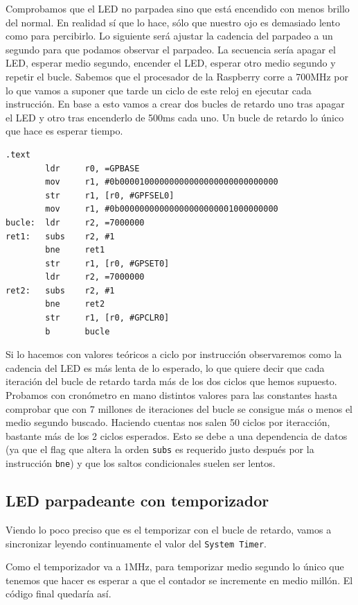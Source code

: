 Comprobamos que el LED no parpadea sino que está encendido con menos brillo del normal.
En realidad sí que lo hace, sólo que nuestro ojo es demasiado lento como para percibirlo.
Lo siguiente será ajustar la cadencia del parpadeo a un segundo para que podamos observar
el parpadeo. La secuencia sería apagar el LED, esperar medio segundo, encender el LED,
esperar otro medio segundo y repetir el bucle. Sabemos que el procesador de la Raspberry
corre a 700MHz por lo que vamos a suponer que tarde un ciclo de este reloj en ejecutar
cada instrucción. En base a esto vamos a crear dos bucles de retardo uno tras apagar el LED
y otro tras encenderlo de 500ms cada uno. Un bucle de retardo lo único que hace es esperar
tiempo. 

\begin{lstlisting}[caption={Parte de esbn4.s},label={lst:codigoPract4_4}]
.text
        ldr     r0, =GPBASE
        mov     r1, #0b00001000000000000000000000000000
        str     r1, [r0, #GPFSEL0]
        mov     r1, #0b00000000000000000000001000000000
bucle:  ldr     r2, =7000000
ret1:   subs    r2, #1
        bne     ret1
        str     r1, [r0, #GPSET0]
        ldr     r2, =7000000
ret2:   subs    r2, #1
        bne     ret2
        str     r1, [r0, #GPCLR0]
        b       bucle
\end{lstlisting}

Si lo hacemos con valores teóricos a ciclo por instrucción observaremos como la cadencia del
LED es más lenta de lo esperado, lo que quiere decir que cada iteración del bucle
de retardo tarda más de los dos ciclos que hemos supuesto.
Probamos con cronómetro en mano distintos valores para las constantes hasta comprobar que con
7 millones de iteraciones del bucle se consigue más o menos el medio segundo buscado. Haciendo
cuentas nos salen 50 ciclos por iteracción, bastante más de los 2 ciclos esperados. Esto se
debe a una dependencia de datos (ya que el flag que altera
la orden {\tt subs} es requerido justo después por la instrucción {\tt bne}) y que los saltos
condicionales suelen ser lentos.

\subsection{LED parpadeante con temporizador}

Viendo lo poco preciso que es el temporizar con el bucle de retardo, vamos a sincronizar leyendo
continuamente el valor del {\tt System Timer}.

Como el temporizador va a 1MHz, para temporizar medio segundo lo
único que tenemos que hacer es esperar a que el contador se incremente en medio millón. El código
final quedaría así.


